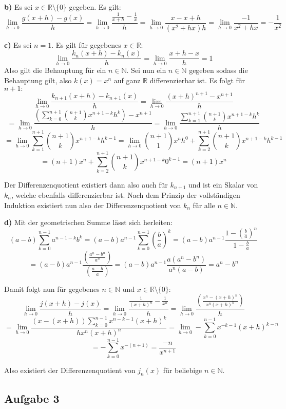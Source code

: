 \documentclass[a4paper,graphics,11pt]{article}
\newcommand{\aufgabe}[1]{\subsection*{Aufgabe #1}}
\begin{document}
\textbf{b)}
Es sei $x \in \mathbb{R}\setminus \{0\}$ gegeben. Es gilt:
$$
    \lim_{h \to 0} \frac{g(x+h)-g(x)}{h}
    = \lim_{h \to 0} \frac{\frac{1}{x+h} - \frac{1}{x}}{h}
    = \lim_{h \to 0} \frac{x-x+h}{(x^2+hx)h}
    = \lim_{h \to 0} \frac{-1}{x^2+hx}
    = -\frac{1}{x^2}
$$
\newpage

\textbf{c)}
Es sei $n=1$. Es gilt für gegebenes $x \in \mathbb{R}\colon$
$$
    \lim_{h \to 0} \frac{k_n(x+h)-k_n(x)}{h}
    = \lim_{h \to 0} \frac{x+h-x}{h}
    = 1
$$
Also gilt die Behauptung für ein $n \in \mathbb{N}$.
Sei nun ein $n \in \mathbb{N}$ gegeben sodass die Behauptung gilt, also $k(x) = x^n$ auf ganz $\mathbb{R}$
differenzierbar ist. Es folgt für $n+1\colon$
$$
    \lim_{h \to 0} \frac{k_{n+1}(x+h)-k_{n+1}(x)}{h}
    = \lim_{h \to 0} \frac{(x+h)^{n+1}-x^{n+1}}{h}
$$$$
    = \lim_{h \to 0} \frac{\displaystyle\left(\sum_{k=0}^{n+1}\binom{n+1}{k}x^{n+1-k}h^k\right)-x^{n+1}}{h}
    = \lim_{h \to 0} \frac{\displaystyle\sum_{k=1}^{n+1}\binom{n+1}{k}x^{n+1-k}h^k}{h}
$$$$
    = \lim_{h \to 0} \sum_{k=1}^{n+1}\binom{n+1}{k}x^{n+1-k}h^{k-1}
    = \lim_{h \to 0} \binom{n+1}{1}x^{n}h^0+\sum_{k=2}^{n+1} \binom{n+1}{k}x^{n+1-k}h^{k-1}
$$$$
    = (n+1)x^n + \sum_{k=2}^{n+1} \binom{n+1}{k}x^{n+1-k}0^{k-1}
    = (n+1)x^n
$$

Der Differenzenquotient existiert dann also auch für $k_{n+1}$ und ist ein Skalar von $k_n$, welche
ebenfalls differenzierbar ist.
Nach dem Prinzip der vollständigen Induktion existiert nun also der Differenzenquotient von $k_n$ für
alle $n \in \mathbb{N}$.

\textbf{d)}
Mit der geometrischen Summe lässt sich herleiten:
$$
    (a-b)\sum_{k=0}^{n-1} a^{n-1-k}b^k
    = (a-b)a^{n-1}\sum_{k=0}^{n-1} \left(\frac{b}{a}\right)^k
    = (a-b)a^{n-1}\frac{1-\left(\frac{b}{a}\right)^n}{1-\frac{b}{a}}
$$$$
    = (a-b)a^{n-1} \frac{\left(\frac{a^n-b^n}{a^n}\right)}{\left(\frac{a-b}{a}\right)}
    = (a-b)a^{n-1} \frac{a(a^n-b^n)}{a^n(a-b)} = a^n-b^n
$$

Damit folgt nun für gegebenes $n \in \mathbb{N}$ und $x \in \mathbb{R}\setminus \{0\}\colon$
$$
    \lim_{h \to 0} \frac{j(x+h)-j(x)}{h}
    = \lim_{h \to 0} \frac{\frac{1}{(x+h)^n} - \frac{1}{x^n}}{h}
    = \lim_{h \to 0} \frac{\left(\frac{x^n-(x+h)^n}{x^n(x+h)^n}\right)}{h}
$$$$
    = \lim_{h \to 0} \frac{(x-(x+h))\sum_{k=0}^{n-1} x^{n-k-1}(x+h)^k}{hx^n(x+h)^n} 
    = \lim_{h \to 0} -\sum_{k=0}^{n-1} x^{-k-1}(x+h)^{k-n}
$$$$
    = -\sum_{k=0}^{n-1} x^{-(n+1)} = \frac{-n}{x^{n+1}}
$$

Also existiert der Differenzenquotient von $j_n(x)$ für beliebige $n \in \mathbb{N}$.

\newpage

\aufgabe{3}
\end{document}
